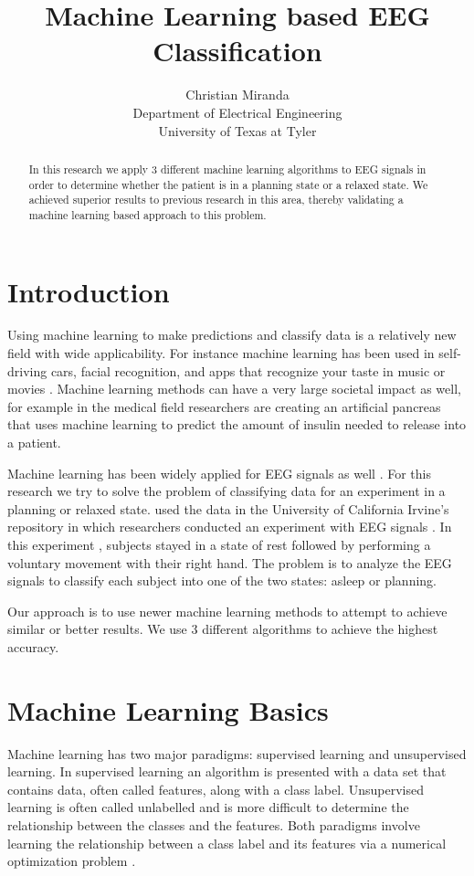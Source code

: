 \documentclass[conference,compsoc]{IEEEtran}
\begin{document}
\author{Christian Miranda\\Department of Electrical Engineering\\University of Texas at Tyler}
\title{Machine Learning based EEG Classification}
\maketitle

\begin{abstract}
In this research we apply 3 different machine learning algorithms to EEG signals in order to determine whether the patient is in a planning state or a relaxed state.  We achieved superior results to previous research in this area, thereby validating a machine learning based approach to this problem.

\end{abstract}

\section{Introduction}
Using machine learning to make predictions and classify data is a relatively new field with wide applicability.  For instance machine learning has been used in self-driving cars, facial recognition, and apps that recognize your taste in music or movies \cite{machine,cars}.  Machine learning methods can have a very large societal impact as well, for example in the medical field researchers are creating an artificial pancreas that uses machine learning \cite{diabetes} to predict the amount of insulin needed to release into a patient.

Machine learning has been widely applied for EEG signals as well \cite{wavelet}. For this research we try to solve the problem of classifying data for an experiment in a planning or relaxed state.  used the data in the University of California Irvine's repository in which researchers conducted an experiment with EEG signals \cite{classsvm}.  In this experiment \cite{rp}, subjects stayed in a state of rest followed by performing a voluntary movement with their right hand. The problem is to analyze the EEG signals to classify each subject into one of the two states: asleep or planning. 

Our approach is to use newer machine learning methods to attempt to achieve similar or better results. We use 3 different algorithms to achieve the highest accuracy. 

\section{Machine Learning Basics}
Machine learning has two major paradigms: supervised learning and unsupervised learning.  In supervised learning an algorithm is presented with a data set that contains data, often called features, along with a class label.  Unsupervised learning is often called unlabelled and is more difficult to determine the relationship between the classes and the features.  Both paradigms involve learning the relationship between a class label and its features via a numerical optimization problem \cite{book}. 
\end{document}
